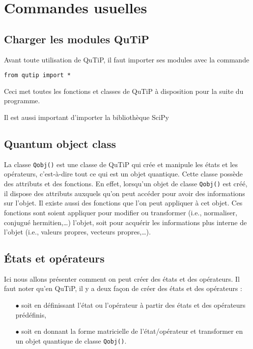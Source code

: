 \section{Commandes usuelles}

\subsection{Charger les modules QuTiP}

Avant toute utilisation de QuTiP, il faut importer ses modules avec la commande
\begin{lstlisting}
from qutip import *
\end{lstlisting}
Ceci met toutes les fonctions et classes de QuTiP à disposition pour la suite 
du programme.

Il est aussi important d'importer la bibliothèque SciPy

\subsection{Quantum object class}
La classe \texttt{Qobj()} est une classe de QuTiP qui crée et manipule les 
états et les opérateurs, c'est-à-dire tout ce qui est un objet quantique. Cette 
classe possède des attributs et des fonctions. En effet, lorsqu'un objet de 
classe \texttt{Qobj()} est créé, il dispose des attributs auxquels qu'on peut 
accéder pour avoir des informations sur l'objet. Il existe aussi des fonctions 
que l'on peut appliquer à cet objet. Ces fonctions sont soient appliquer pour 
modifier ou transformer (i.e., normaliser, conjugué hermitien,\ldots) l'objet, 
soit pour acquérir les informations plus interne de l'objet (i.e., valeurs 
propres, vecteurs propres,\ldots).

\subsection{États et opérateurs}
Ici nous allons présenter comment on peut créer des états et des opérateurs. Il 
faut noter qu'en QuTiP, il y a deux façon de créer des états et des opérateurs :
\begin{itemize}
\item[$\bullet$] soit en définissant l'état ou l'opérateur à partir des états et 
des opérateurs prédéfinis,
\item[$\bullet$] soit en donnant la forme matricielle de l'état/opérateur et 
transformer en un objet quantique de classe \texttt{Qobj()}.
\end{itemize}

